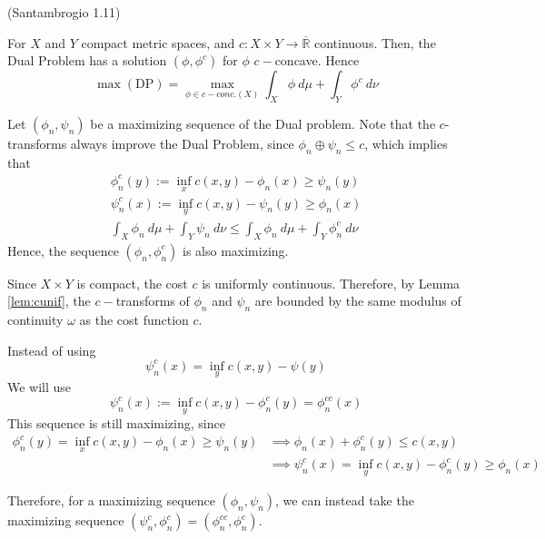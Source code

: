 \begin{theorem}(Santambrogio 1.11)

  For $X$ and $Y$ compact metric spaces, and $c:X \times Y \to
    \overline{\mathbb R}$ continuous. Then, the Dual Problem
  has a solution $(\phi,\phi^c)$ for $\phi$ $c-$concave. Hence
  \begin{equation}
    \max(\mathrm{DP}) =
    \max_{\phi \in c-conc.(X)} \int_X \phi \ d\mu +
    \int_Y \phi^c \ d\nu
  \end{equation}
  \label{thm:c-conc}
\end{theorem}
\begin{prf}
  Let $(\phi_n,\psi_n)$ be a maximizing sequence of the Dual problem.
  Note that the $c$-transforms always improve the Dual Problem, since
  $\phi_n\oplus \psi_n \leq c$, which implies that
  \begin{align*}
    \phi_n^c(y):= \inf_x c(x,y) - \phi_n(x) \geq \psi_n(y) \\
    \psi_n^c(x):= \inf_y c(x,y) - \psi_n(y) \geq \phi_n(x) \\
    \int_X \phi_n \ d\mu +
    \int_Y \psi_n \ d\nu \leq
    \int_X \phi_n \ d\mu +
    \int_Y \phi_n^c \ d\nu
  \end{align*}
  Hence, the sequence $(\phi_n, \phi^c_n)$ is also maximizing.

  Since $X \times Y$ is compact, the cost $c$ is uniformly continuous. Therefore,
  by Lemma \ref{lem:cunif}, the $c-$transforms of $\phi_n$ and $\psi_n$ are bounded by the
  same modulus of continuity $\omega$ as the cost function $c$.

  Instead of using
  \begin{equation*}
    \psi^c_n (x) = \inf_y c(x,y) - \psi(y)
  \end{equation*}
  We will use
  \begin{equation*}
    \psi^c_n (x) := \inf_y c(x,y) - \phi_n^c(y) = \phi_n^{c c}(x)
  \end{equation*}
  This sequence is still maximizing, since
  \begin{align*}
    \phi_n^c(y)  = \inf_x c(x,y) - \phi_n(x) \geq \psi_n(y) &\implies 
    \phi_n(x) + \phi_n^c(y) \leq c(x,y)                        \\
    &\implies
    \psi_n^c(x)  = \inf_y c(x,y) - \phi_n^c(y) \geq \phi_n(x)
  \end{align*}

  Therefore, for a maximizing sequence $(\phi_n,\psi_n)$, we can
  instead take the maximizing sequence
  $(\psi^c_n,\phi^c_n)=(\phi^{c c}_n,\phi^c_n)$.


\end{prf}
